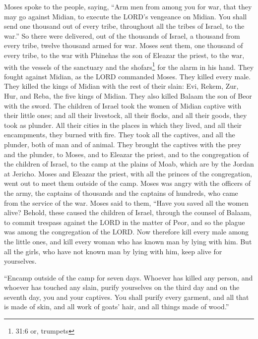 \myverse{}Moses spoke to the people, saying, “Arm men from among you for
war, that they may go against Midian, to execute the LORD’s vengeance on Midian.
\myverse{}You shall send one thousand out of every tribe, throughout all the tribes of
Israel, to the war.”
\myverse{}So there were delivered, out of the thousands of Israel, a thousand from every
tribe, twelve thousand armed for war.
\myverse{}Moses sent them, one thousand of every tribe, to the war with Phinehas the
son of Eleazar the priest, to the war, with the vessels of the sanctuary and the shofars\footnote{ 31:6 or, trumpets}
for the alarm in his hand.
\myverse{}They fought against Midian, as the LORD commanded Moses. They killed every
male.
\myverse{}They killed the kings of Midian with the rest of their slain: Evi, Rekem, Zur,
Hur, and Reba, the five kings of Midian. They also killed Balaam the son of Beor with the sword.
\myverse{}The children of Israel took the women of Midian captive with their little ones;
and all their livestock, all their flocks, and all their goods, they took as plunder.
\myverse{}All their cities in the places in which they lived, and all their encampments,
they burned with fire.
\myverse{}They took all the captives, and all the plunder, both of man and of animal.
\myverse{}They brought the captives with the prey and the plunder, to Moses, and to
Eleazar the priest, and to the congregation of the children of Israel, to the camp at the plains of Moab,
which are by the Jordan at Jericho.
\myverse{}Moses and Eleazar the priest, with all the princes of the congregation, went
out to meet them outside of the camp.
\myverse{}Moses was angry with the officers of the army, the captains of thousands
and the captains of hundreds, who came from the service of the war.
\myverse{}Moses said to them, “Have you saved all the women alive?
\myverse{}Behold, these caused the children of Israel, through the counsel of Balaam,
to commit trespass against the LORD in the matter of Peor, and so the plague was among the congregation
of the LORD.
\myverse{}Now therefore kill every male among the little ones, and kill every woman
who has known man by lying with him.
\myverse{}But all the girls, who have not known man by lying with him, keep alive for
yourselves.


\myverse{}“Encamp outside of the camp for seven days. Whoever has killed
any person, and whoever has touched any slain, purify yourselves on the third day and on the seventh day,
you and your captives.
\myverse{}You shall purify every garment, and all that is made of skin, and all work
of goats’ hair, and all things made of wood.”


